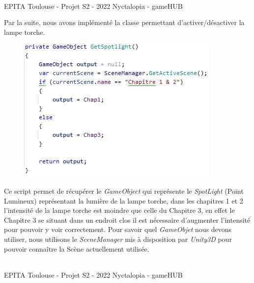    
\vfill
\noindent\makebox[\linewidth]{\rule{.8\paperwidth}{.6pt}}\\[0.2cm]
EPITA Toulouse - Projet S2 - 2022 \hfill Nyctalopia - gameHUB
\noindent\makebox[\linewidth]{\rule{.8\paperwidth}{.6pt}}
\newpage


\par

Par la suite, nous avons implémenté la classe permettant d'activer/désactiver la lampe torche.
\begin{description}
\begin{figure}[H]
\centering
\begin{minipage}{.5\textwidth}
  \centering
  \centerline{\includegraphics[width=1.5\linewidth]{img/gameplay/getspotlight.PNG}}
  \label{fig:octobercrowfont}
\end{minipage}%
\end{figure}
    \item[\emph{} GetSpotlight-] Ce script permet de récupérer le \emph{GameObject} qui représente le \emph{SpotLight} (Point Lumineux) représentant la lumière de la lampe torche, dans les chapitres 1 et 2 l’intensité de la lampe torche est moindre que celle du Chapitre 3, en effet le Chapitre 3 se situant dans un endroit clos il est nécessaire d’augmenter l’intensité pour pouvoir y voir correctement. Pour savoir quel \emph{GameObjet} nous devons utiliser, nous utilisons le \emph{SceneManager} mis à disposition par \emph{Unity3D} pour pouvoir connaître la Scène actuellement utilisée.

\vfill
\noindent\makebox[\linewidth]{\rule{.8\paperwidth}{.6pt}}\\[0.2cm]
EPITA Toulouse - Projet S2 - 2022 \hfill Nyctalopia - gameHUB
\noindent\makebox[\linewidth]{\rule{.8\paperwidth}{.6pt}}
\newpage
    

\end{description}
